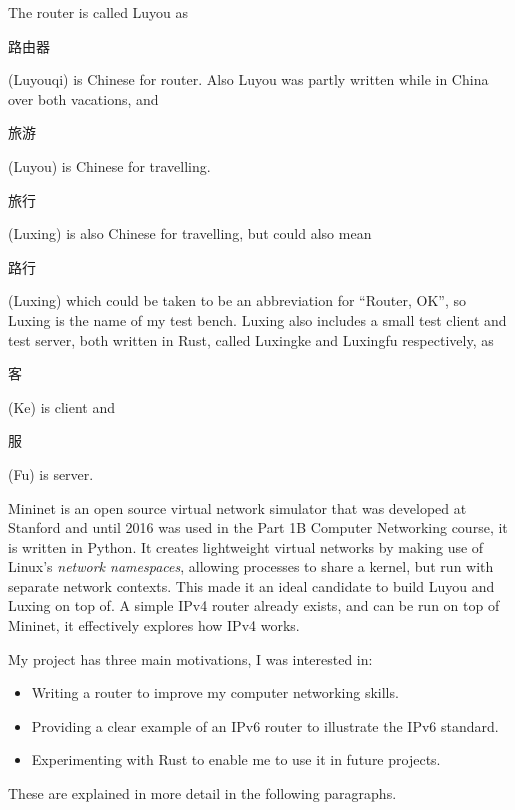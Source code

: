 \documentclass[12pt,a4paper,twoside,openany]{report}
\begin{document}
The router is called Luyou as \begin{CJK}{UTF8}{gbsn}路由器\end{CJK} (Luyouqi) is Chinese for router. Also Luyou was partly written while in China over both vacations, and \begin{CJK}{UTF8}{gbsn}旅游\end{CJK} (Luyou) is Chinese for travelling. \begin{CJK}{UTF8}{gbsn}旅行\end{CJK} (Luxing) is also Chinese for travelling, but could also mean \begin{CJK}{UTF8}{gbsn}路行\end{CJK} (Luxing) which could be taken to be an abbreviation for ``Router, OK'', so Luxing is the name of my test bench. Luxing also includes a small test client and test server, both written in Rust\cite{rust}, called Luxingke and Luxingfu respectively, as \begin{CJK}{UTF8}{gbsn}客\end{CJK} (Ke) is client and \begin{CJK}{UTF8}{gbsn}服\end{CJK} (Fu) is server.

\bigskip

Mininet\cite{mininet} is an open source virtual network simulator that was developed at Stanford and until 2016 was used in the Part 1B Computer Networking course, it is written in Python.  It creates lightweight virtual networks by making use of Linux's \textit{network namespaces}, allowing processes to share a kernel, but run with separate network contexts. This made it an ideal candidate to build Luyou and Luxing on top of. \label{lab::simple_router}A simple IPv4 router\cite{simple_router} already exists, and can be run on top of Mininet, it effectively explores how IPv4 works. 

\bigskip

My project has three main motivations, I was interested in:
\begin{itemize}
\item Writing a router to improve my computer networking skills.
\item Providing a clear example of an IPv6 router to illustrate the IPv6 standard.
\item Experimenting with Rust to enable me to use it in future projects.
\end{itemize}
These are explained in more detail in the following paragraphs.
\end{document}
